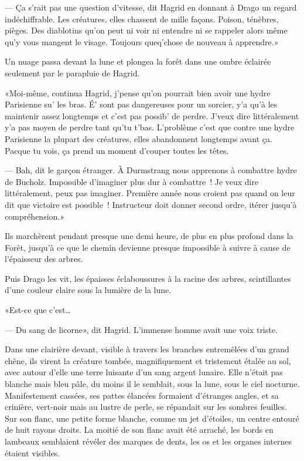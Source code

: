 --- Ça s'rait pas une question d'vitesse, dit Hagrid en donnant à Drago un regard indéchiffrable. Les créatures, elles chassent de mille façons. Poison, ténèbres, pièges. Des diablotins qu'on peut ni voir ni entendre ni se rappeler alors même qu'y vous mangent le visage. Toujours queq'chose de nouveau à apprendre.»

Un nuage passa devant la lune et plongea la forêt dans une ombre éclairée seulement par le parapluie de Hagrid.

«Moi-même, continua Hagrid, j'pense qu'on pourrait bien avoir une hydre Parisienne su' les bras. É' sont pas dangereuses pour un sorcier, y'a qu'à les maintenir assez longtemps et c'est pas possib' de perdre. J'veux dire littéralement y'a pas moyen de perdre tant qu'tu t'bas. L'problème c'est que contre une hydre Parisienne la plupart des créatures, elles abandonnent longtemps avant ça. Pacque tu vois, ça prend un moment d'couper toutes les têtes.

--- Bah, dit le garçon étranger. À Durmstrang nous apprenons à combattre hydre de Bucholz. Impossible d'imaginer plus dur à combattre~! Je veux dire littéralement, peux pas imaginer. Première année nous croient pas quand on leur dit que victoire est possible~! Instructeur doit donner second ordre, itérer jusqu'à compréhension.»

Ils marchèrent pendant presque une demi heure, de plus en plus profond dans la Forêt, jusqu'à ce que le chemin devienne presque impossible à suivre à cause de l'épaisseur des arbres.

Puis Drago les vit, les épaisses éclaboussures à la racine des arbres, scintillantes d'une couleur claire sous la lumière de la lune.

«Est-ce que c'est…

--- Du sang de licorne», dit Hagrid. L'immense homme avait une voix triste.

Dans une clairière devant, visible à travers les branches entremêlées d'un grand chêne, ils virent la créature tombée, magnifiquement et tristement étalée au sol, avec autour d'elle une terre luisante d'un sang argent lunaire. Elle n'était pas blanche mais bleu pâle, du moins il le semblait, sous la lune, sous le ciel nocturne. Manifestement cassées, ses pattes élancées formaient d'étranges angles, et sa crinière, vert-noir mais au lustre de perle, se répandait sur les sombres feuilles. Sur son flanc, une petite forme blanche, comme un jet d'étoiles, un centre entouré de huit rayons droits. La moitié de son flanc avait été arraché, les bords en lambeaux semblaient révéler des marques de dents, les os et les organes internes étaient visibles.

